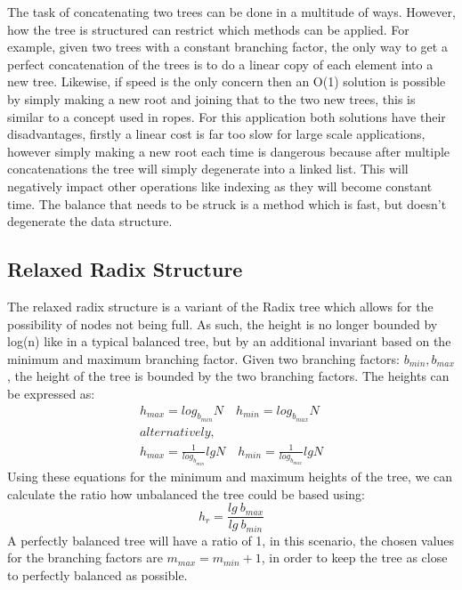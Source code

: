 \documentclass[11pt,a4paper,oneside]{article}
\begin{document}
The task of concatenating two trees can be done in a multitude of ways. However, how the tree is structured can restrict which methods can be applied. For example, given two trees with a constant branching factor, the only way to get a perfect concatenation of the trees is to do a linear copy of each element into a new tree. Likewise, if speed is the only concern then an O(1) solution is possible by simply making a new root and joining that to the two new trees, this is similar to a concept used in ropes\citep{boehm1995ropes}. For this application both solutions have their disadvantages, firstly a linear cost is far too slow for large scale applications, however simply making a new root each time is dangerous because after multiple concatenations the tree will simply degenerate into a linked list. This will negatively impact other operations like indexing as they will become constant time. The balance that needs to be struck is a method which is fast, but doesn't degenerate the data structure.

\subsection{Relaxed Radix Structure}

The relaxed radix structure is a variant of the Radix tree which allows for the possibility of nodes not being full. As such, the height is no longer bounded by log(n) like in a typical balanced tree, but by an additional invariant based on the minimum and maximum branching factor\citep{bagwell2011rrb}. Given two branching factors: $b_{min}, b_{max}$, the height of the tree is bounded by the two branching factors. The heights can be expressed as:
\begin{gather*}
h_{max} = log_{b_{min}} N \quad h_{min} = log_{b_{max}} N \\
alternatively, \\
h_{max} = \frac{1}{log_{b_{min}}}lg N \quad h_{min} = \frac{1}{log_{b_{max}}}lg N
\end{gather*}
Using these equations for the minimum and maximum heights of the tree, we can calculate the ratio how unbalanced the tree could be based using:
\begin{equation*}
h_r = \frac{lg\ b_{max}}{lg\ b_{min}}
\end{equation*}
A perfectly balanced tree will have a ratio of 1, in this scenario, the chosen values for the branching factors are $m_{max} = m_{min} + 1$, in order to keep the tree as close to perfectly balanced as possible.
\end{document}

